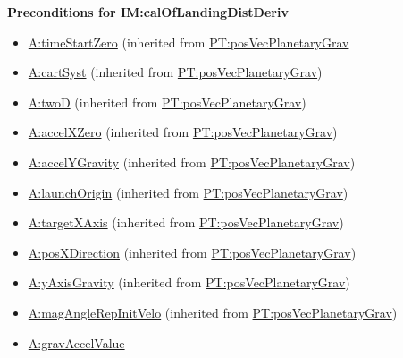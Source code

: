 \documentclass[12pt]{article}
\begin{document}
\noindent \textbf{Preconditions for IM:calOfLandingDistDeriv}
\begin{itemize}
\item \hyperref[timeStartZero]{A:timeStartZero} (inherited from \hyperref[PT:posVecPlanetaryGrav]{PT:posVecPlanetaryGrav}
\item \hyperref[cartSyst]{A:cartSyst} (inherited from \hyperref[PT:posVecPlanetaryGrav]{PT:posVecPlanetaryGrav})
\item \hyperref[twoD]{A:twoD} (inherited from \hyperref[PT:posVecPlanetaryGrav]{PT:posVecPlanetaryGrav})
\item \hyperref[accelXZero]{A:accelXZero} (inherited from \hyperref[PT:posVecPlanetaryGrav]{PT:posVecPlanetaryGrav})
\item \hyperref[accelYGravity]{A:accelYGravity} (inherited from \hyperref[PT:posVecPlanetaryGrav]{PT:posVecPlanetaryGrav})
\item \hyperref[launchOrigin]{A:launchOrigin} (inherited from \hyperref[PT:posVecPlanetaryGrav]{PT:posVecPlanetaryGrav})
\item \hyperref[targetXAxis]{A:targetXAxis} (inherited from \hyperref[PT:posVecPlanetaryGrav]{PT:posVecPlanetaryGrav})
\item \hyperref[posXDirection]{A:posXDirection} (inherited from \hyperref[PT:posVecPlanetaryGrav]{PT:posVecPlanetaryGrav})
\item \hyperref[yAxisGravity]{A:yAxisGravity} (inherited from \hyperref[PT:posVecPlanetaryGrav]{PT:posVecPlanetaryGrav})
\item \hyperref[magAngleRepInitVelo]{A:magAngleRepInitVelo} (inherited from \hyperref[PT:posVecPlanetaryGrav]{PT:posVecPlanetaryGrav})
\item \hyperref[gravAccelValue]{A:gravAccelValue}

\end{itemize}
\end{document}
